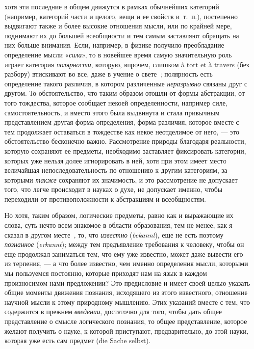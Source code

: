хотя эти последние в общем движутся в рамках обычнейших категорий
(например, категорий части и целого, вещи и ее свойств и~т.~п.), постепенно
выдвигают также и более высокие отношения мысли, или по крайней мере,
поднимают их до большей всеобщности и тем самым заставляют обращать на них
больше внимания. Если, например, в физике получило преобладание определение
мысли «{\em сила}», то в новейшее время самую
значительную роль играет категория {\em полярности},
которую, впрочем, слишком à tort et à travers (без разбору) втискивают во
все, даже в учение о
свете~\textstyleEndnodeLink{(\ref{bkm:Ref474656170}}\label{bkm:bm03}\textstyleEndnodeLink{)};
полярность есть определение такого различия, в котором различенные
{\em неразрывно} связаны друг с другом. То
обстоятельство, что таким образом отошли от формы абстракции, от того
тождества, которое сообщает некоей определенности, например силе,
самостоятельность, и вместо этого была выдвинута и стала привычным
представлением другая форма определения, форма различия, которое вместе с
тем продолжает оставаться в тождестве как некое неотделимое от него, — это
обстоятельство бесконечно важно. Рассмотрение природы благодаря реальности,
которую сохраняют ее предметы, необходимо заставляет фиксировать категории,
которых уже нельзя долее игнорировать в ней, хотя при этом имеет место
величайшая непоследовательность по отношению к другим категориям, за
которыми {\em также} сохраняют их значимость, и это
рассмотрение не допускает того, что легче происходит в науках о духе, не
допускает именно, чтобы переходили от противоположности к абстракциям и
всеобщностям.

Но хотя, таким образом, логические предметы, равно как и выражающие их
слова, суть нечто всем знакомое в области образования, тем не менее, как я
сказал в другом
месте~\textstyleEndnodeLink{(\ref{bkm:Ref474656176}}\label{bkm:bm04}\textstyleEndnodeLink{)},
то, что {\em известно}
({\em bekannt}), еще не есть поэтому
{\em познанное} ({\em erkannt});
между тем предъявление требования к человеку, чтобы он еще продолжал
заниматься тем, что ему уже известно, может даже вывести его из терпения, —
а что более известно, чем именно определения мысли, которыми мы пользуемся
постоянно, которые приходят нам на язык в каждом произносимом нами
предложении? Это предисловие и имеет своей целью указать общие моменты
движения познания, исходящего из этого известного, отношение научной мысли
к этому природному мышлению. Этих указаний вместе с тем, что содержится в
прежнем {\em введении}, достаточно для того, чтобы дать
общее представление о смысле логического познания, то общее представление,
которое желают получить о науке, к которой приступают, предварительно, до
этой науки, которая уже есть сам предмет (die Sache selbst).

